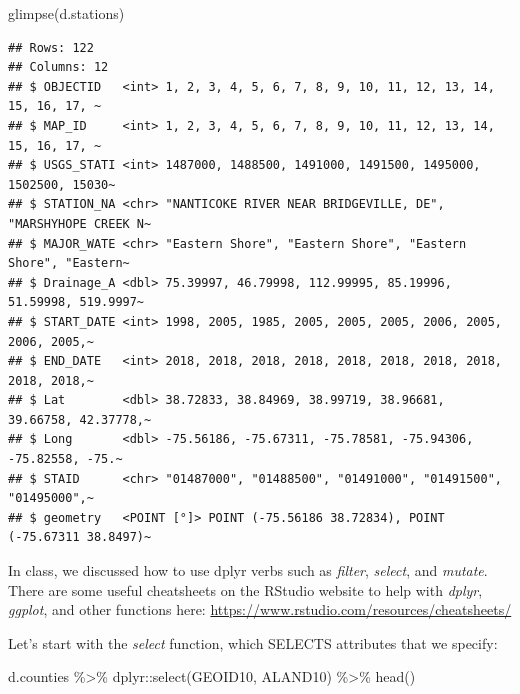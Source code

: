 \documentclass[]{article}
\newenvironment{Shaded}{\begin{snugshade}}{\end{snugshade}}
\newcommand{\FunctionTok}[1]{\textcolor[rgb]{0.00,0.00,0.00}{#1}}
\newcommand{\NormalTok}[1]{#1}
\newcommand{\SpecialCharTok}[1]{\textcolor[rgb]{0.00,0.00,0.00}{#1}}
\begin{document}
\begin{Shaded}
\begin{Highlighting}[]
\FunctionTok{glimpse}\NormalTok{(d.stations)}
\end{Highlighting}
\end{Shaded}

\begin{verbatim}
## Rows: 122
## Columns: 12
## $ OBJECTID   <int> 1, 2, 3, 4, 5, 6, 7, 8, 9, 10, 11, 12, 13, 14, 15, 16, 17, ~
## $ MAP_ID     <int> 1, 2, 3, 4, 5, 6, 7, 8, 9, 10, 11, 12, 13, 14, 15, 16, 17, ~
## $ USGS_STATI <int> 1487000, 1488500, 1491000, 1491500, 1495000, 1502500, 15030~
## $ STATION_NA <chr> "NANTICOKE RIVER NEAR BRIDGEVILLE, DE", "MARSHYHOPE CREEK N~
## $ MAJOR_WATE <chr> "Eastern Shore", "Eastern Shore", "Eastern Shore", "Eastern~
## $ Drainage_A <dbl> 75.39997, 46.79998, 112.99995, 85.19996, 51.59998, 519.9997~
## $ START_DATE <int> 1998, 2005, 1985, 2005, 2005, 2005, 2006, 2005, 2006, 2005,~
## $ END_DATE   <int> 2018, 2018, 2018, 2018, 2018, 2018, 2018, 2018, 2018, 2018,~
## $ Lat        <dbl> 38.72833, 38.84969, 38.99719, 38.96681, 39.66758, 42.37778,~
## $ Long       <dbl> -75.56186, -75.67311, -75.78581, -75.94306, -75.82558, -75.~
## $ STAID      <chr> "01487000", "01488500", "01491000", "01491500", "01495000",~
## $ geometry   <POINT [°]> POINT (-75.56186 38.72834), POINT (-75.67311 38.8497)~
\end{verbatim}

In class, we discussed how to use dplyr verbs such as \emph{filter},
\emph{select}, and \emph{mutate}. There are some useful cheatsheets on
the RStudio website to help with \emph{dplyr}, \emph{ggplot}, and other
functions here: \url{https://www.rstudio.com/resources/cheatsheets/}

Let's start with the \emph{select} function, which SELECTS attributes
that we specify:

\begin{Shaded}
\begin{Highlighting}[]
\NormalTok{d.counties }\SpecialCharTok{\%\textgreater{}\%}\NormalTok{ dplyr}\SpecialCharTok{::}\FunctionTok{select}\NormalTok{(GEOID10, ALAND10) }\SpecialCharTok{\%\textgreater{}\%} \FunctionTok{head}\NormalTok{() }
\end{Highlighting}
\end{Shaded}
\end{document}
